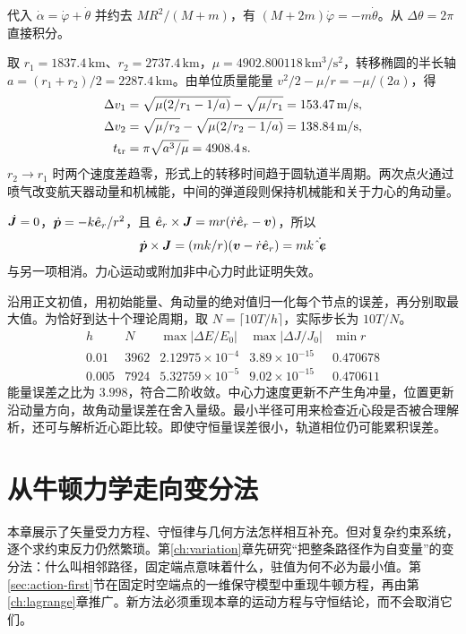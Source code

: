 \begin{bookexercises}
代入 $\dot\alpha=\dot\varphi+\dot\theta$ 并约去 $MR^2/(M+m)$，有 $(M+2m)\dot\varphi=-m\dot\theta$。从 $\Delta\theta=2\pi$ 直接积分。
\item 取 $r_1=1837.4\,\mathrm{km}$、$r_2=2737.4\,\mathrm{km}$，$\mu=4902.800118\,\mathrm{km^3/s^2}$，转移椭圆的半长轴 $a=(r_1+r_2)/2=2287.4\,\mathrm{km}$。由单位质量能量 $v^2/2-\mu/r=-\mu/(2a)$，得
\begin{align*}
\Delta v_1&=\sqrt{\mu(2/r_1-1/a)}-\sqrt{\mu/r_1}
            =153.47\,\mathrm{m/s},\\
\Delta v_2&=\sqrt{\mu/r_2}-\sqrt{\mu(2/r_2-1/a)}
            =138.84\,\mathrm{m/s},\\
t_{\rm tr}&=\pi\sqrt{a^3/\mu}=4908.4\,\mathrm{s}.
\end{align*}
$r_2\to r_1$ 时两个速度差趋零，形式上的转移时间趋于圆轨道半周期。两次点火通过喷气改变航天器动量和机械能，中间的弹道段则保持机械能和关于力心的角动量。
\item $\dot{\boldsymbol{J}}=0$，$\dot{\boldsymbol{p}}=-k\hat{\boldsymbol{e}}_r/r^2$，且 $\hat{\boldsymbol{e}}_r\times\boldsymbol{J}=mr(\dot r\hat{\boldsymbol{e}}_r-\boldsymbol{v})$，所以 
\[\dot{\boldsymbol{p}}\times\boldsymbol{J}=(mk/r)(\boldsymbol{v}-\dot r\hat{\boldsymbol{e}}_r)=mk\dot{\hat{\boldsymbol{e}}_r}\]
与另一项相消。力心运动或附加非中心力时此证明失效。
\item 沿用正文初值，用初始能量、角动量的绝对值归一化每个节点的误差，再分别取最大值。为恰好到达十个理论周期，取 $N=\lceil 10T/h\rceil$，实际步长为 $10T/N$。
\[
\begin{array}{c|r|ccc}
h & N & \max|\Delta E/E_0| & \max|\Delta J/J_0| & \min r\\ \hline
0.01 &3962&2.12975\times10^{-4}&3.89\times10^{-15}&0.470678\\
0.005&7924&5.32759\times10^{-5}&9.02\times10^{-15}&0.470611
\end{array}
\]
能量误差之比为 $3.998$，符合二阶收敛。中心力速度更新不产生角冲量，位置更新沿动量方向，故角动量误差在舍入量级。最小半径可用来检查近心段是否被合理解析，还可与解析近心距比较。即使守恒量误差很小，轨道相位仍可能累积误差。
\end{bookexercises}

\section*{从牛顿力学走向变分法}
本章展示了矢量受力方程、守恒律与几何方法怎样相互补充。但对复杂约束系统，逐个求约束反力仍然繁琐。第\ref{ch:variation}章先研究“把整条路径作为自变量”的变分法：什么叫相邻路径，固定端点意味着什么，驻值为何不必为最小值。第\ref{sec:action-first}节在固定时空端点的一维保守模型中重现牛顿方程，再由第\ref{ch:lagrange}章推广。新方法必须重现本章的运动方程与守恒结论，而不会取消它们。

